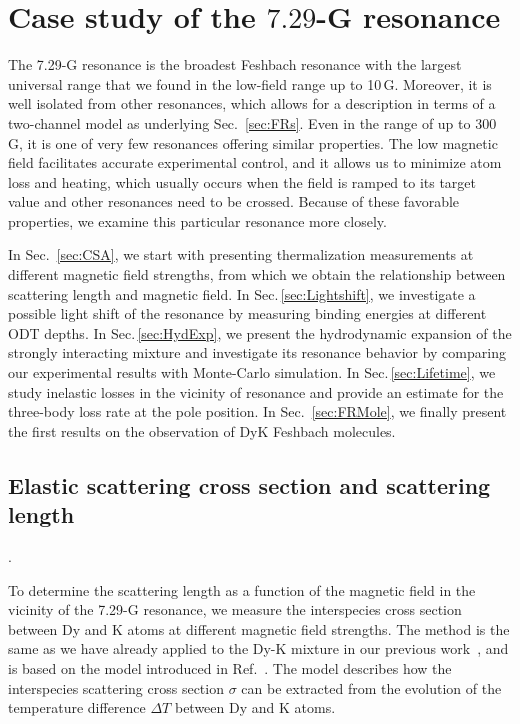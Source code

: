 \section{\label{sec:7G}Case study of the $7.29$-G resonance}

The 7.29-G resonance is the broadest Feshbach resonance with the largest universal range that we found in the low-field range up to 10\,G. Moreover, it is well isolated from other resonances, which allows for a description in terms of a two-channel model as underlying Sec.~\ref{sec:FRs}. Even in the range of up to 300\,G, it is one of very few resonances offering similar properties. The low magnetic field facilitates accurate experimental control, and it allows us to minimize atom loss and heating, which usually occurs when the field is ramped to its target value and other resonances need to be crossed. Because of these favorable properties, we examine this particular resonance more closely.

In Sec.~\ref{sec:CSA}, we start with presenting thermalization measurements at different magnetic field strengths, from which we obtain the relationship between scattering length and magnetic field. In Sec.\,\ref{sec:Lightshift}, we investigate a possible light shift of the resonance by measuring binding energies at different ODT depths. In Sec.\,\ref{sec:HydExp}, we present the hydrodynamic expansion of the strongly interacting mixture and investigate its resonance behavior by comparing our experimental results with Monte-Carlo simulation. In Sec.\,\ref{sec:Lifetime}, we study inelastic losses in the vicinity of resonance and provide an estimate for the three-body loss rate at the pole position. In Sec.~\ref{sec:FRMole}, we finally present the first results on the observation of DyK Feshbach molecules.

\subsection{Elastic scattering cross section and scattering length}.
\label{sec:CSA} 

To determine the scattering length as a function of the magnetic field in the vicinity of the 7.29-G resonance, we measure the interspecies cross section between Dy and K atoms at different magnetic field strengths. The method is the same as we have already applied to the Dy-K mixture in our previous work~\cite{Ravensbergen2020rif,Ravensbergen2018poa}, and is based on the model introduced in Ref.~\cite{Mosk2001mou}. The model describes how the interspecies scattering cross section $\sigma$ can be extracted from the evolution of the temperature difference $\Delta T$ between Dy and K atoms.

